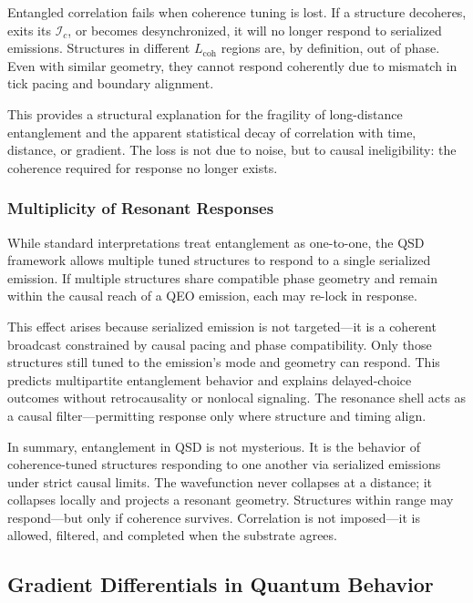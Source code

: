 \documentclass[entropy,article,submit,pdftex,moreauthors]{Definitions/mdpi}
\begin{document}
Entangled correlation fails when coherence tuning is lost. If a structure decoheres, exits its \( \mathcal{I}_c \), or becomes desynchronized, it will no longer respond to serialized emissions. Structures in different \( L_{\text{coh}} \) regions are, by definition, out of phase. Even with similar geometry, they cannot respond coherently due to mismatch in tick pacing and boundary alignment.

This provides a structural explanation for the fragility of long-distance entanglement and the apparent statistical decay of correlation with time, distance, or gradient. The loss is not due to noise, but to causal ineligibility: the coherence required for response no longer exists.

\subsubsection*{Multiplicity of Resonant Responses}

While standard interpretations treat entanglement as one-to-one, the QSD framework allows multiple tuned structures to respond to a single serialized emission. If multiple structures share compatible phase geometry and remain within the causal reach of a QEO emission, each may re-lock in response.

This effect arises because serialized emission is not targeted—it is a coherent broadcast constrained by causal pacing and phase compatibility. Only those structures still tuned to the emission’s mode and geometry can respond. This predicts multipartite entanglement behavior and explains delayed-choice outcomes without retrocausality or nonlocal signaling. The resonance shell acts as a causal filter—permitting response only where structure and timing align.

\smallskip

In summary, entanglement in QSD is not mysterious. It is the behavior of coherence-tuned structures responding to one another via serialized emissions under strict causal limits. The wavefunction never collapses at a distance; it collapses locally and projects a resonant geometry. Structures within range may respond—but only if coherence survives. Correlation is not imposed—it is allowed, filtered, and completed when the substrate agrees.


\subsection{Gradient Differentials in Quantum Behavior}
\label{subsec:gradienteffects}
\end{document}
